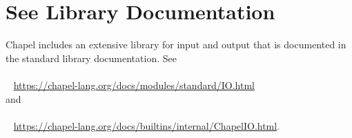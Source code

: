 \label{Input_and_Output}

\section{See Library Documentation}

Chapel includes an extensive library for input and output that is
documented in the standard library documentation. See
\\ %
\mbox{$$ $$ $$ $$ $$} %
\url{https://chapel-lang.org/docs/modules/standard/IO.html}
\\
and
\\ %
\mbox{$$ $$ $$ $$ $$} %
\url{https://chapel-lang.org/docs/builtins/internal/ChapelIO.html}.

